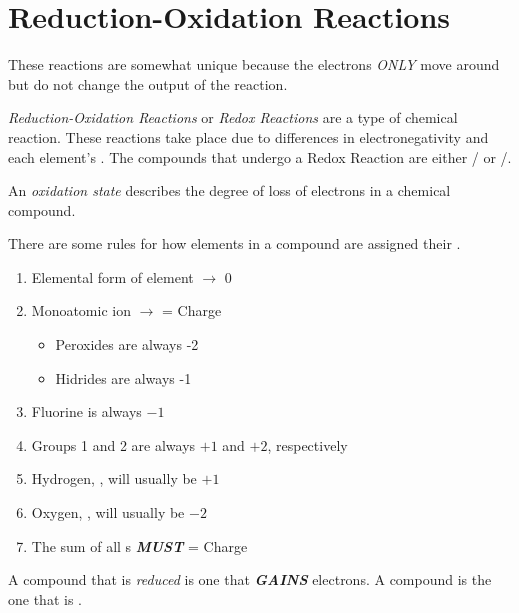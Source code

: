 \section{Reduction-Oxidation Reactions} \label{sec:Redox Reactions}
These reactions are somewhat unique because the electrons \emph{ONLY} move around but do not change the output of the reaction.

\begin{definition} \label{def:Redox Reactions}
  \emph{Reduction-Oxidation Reactions} or \emph{Redox Reactions} are a type of chemical reaction.
  These reactions take place due to differences in electronegativity and each element's .
  The compounds that undergo a Redox Reaction are either / or /.
\end{definition}

\begin{definition} \label{def:Oxidation State}
  An \emph{oxidation state} describes the degree of loss of electrons in a chemical compound.
\end{definition}

There are some rules for how elements in a compound are assigned their .

\begin{enumerate}
  \item Elemental form of element $\rightarrow$ $0$
  \item Monoatomic ion $\rightarrow$  = Charge
  \begin{itemize}
    \item Peroxides  are always -2
    \item Hidrides  are always -1
  \end{itemize}
  \item Fluorine is always $-1$
  \item Groups 1 and 2 are always $+1$ and $+2$, respectively
  \item Hydrogen, , will usually be $+1$
  \item Oxygen, , will usually be $-2$
  \item The sum of all s \textbf{\emph{MUST}} = Charge
\end{enumerate}

\begin{definition}[Reduced] \label{def:Reduced}
  A compound that is \emph{reduced} is one that \textbf{\emph{GAINS}} electrons.
  A  compound is the one that is .
\end{definition}

